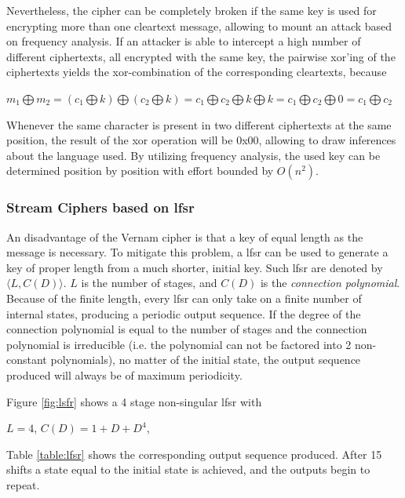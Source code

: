 Nevertheless, the cipher can be completely broken if the same key is used for encrypting more than one cleartext message, allowing to mount
an attack based on frequency analysis.
If an attacker is able to intercept a high number of different ciphertexts, all encrypted with the same key, the pairwise xor'ing of the ciphertexts
yields the xor-combination of the corresponding cleartexts, because
\begin{center}
 $m_1 \bigoplus m_2 = (c_1 \bigoplus k) \bigoplus (c_2 \bigoplus k) = c_1 \bigoplus c_2 \bigoplus k \bigoplus k = c_1 \bigoplus c_2 \bigoplus 0 = c_1 \bigoplus c_2$
\end{center}

Whenever the same character is present in two different ciphertexts at the same position, the result of the \gls{xor} operation will be 0x00, allowing to draw
inferences about the language used. By utilizing frequency analysis, the used key can be determined position by position with effort bounded by $O(n^2)$.

\subsubsection{Stream Ciphers based on \gls{lfsr}}

An disadvantage of the Vernam cipher is that a key of equal length as the message is necessary. To mitigate this problem, a \gls{lfsr} can be used to generate
a key of proper length from a much shorter, initial key. Such \gls{lfsr} are denoted by $\langle L, C(D) \rangle$. $L$ is the number of stages, and $C(D)$ is the
\textit{connection polynomial}. Because of the finite length, every \gls{lfsr} can only take on a finite number of internal states, producing
a periodic output sequence.
If the degree of the connection polynomial is equal to the number of stages and the connection polynomial is irreducible (i.e. the polynomial can not
be factored into 2 non-constant polynomials), no matter of the initial state, the output sequence produced will always be of maximum periodicity.

Figure \ref{fig:lsfr} shows a 4 stage non-singular \gls{lfsr} with

\begin{center}
 $L=4$,  $C(D) = 1 + D + D^4$,
\end{center}

Table \ref{table:lfsr} \cite{handbookLFSR} shows the corresponding output sequence produced. After
15 shifts a state equal to the initial state is achieved, and the outputs
begin to repeat.

